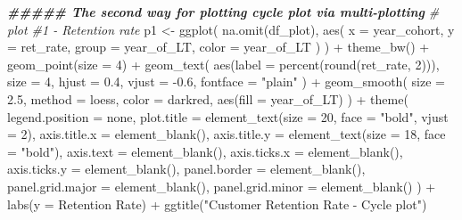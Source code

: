 \documentclass[
]{book}
\newenvironment{Shaded}{\begin{snugshade}}{\end{snugshade}}
\newcommand{\AttributeTok}[1]{\textcolor[rgb]{0.77,0.63,0.00}{#1}}
\newcommand{\CommentTok}[1]{\textcolor[rgb]{0.56,0.35,0.01}{\textit{#1}}}
\newcommand{\DecValTok}[1]{\textcolor[rgb]{0.00,0.00,0.81}{#1}}
\newcommand{\DocumentationTok}[1]{\textcolor[rgb]{0.56,0.35,0.01}{\textbf{\textit{#1}}}}
\newcommand{\FloatTok}[1]{\textcolor[rgb]{0.00,0.00,0.81}{#1}}
\newcommand{\FunctionTok}[1]{\textcolor[rgb]{0.00,0.00,0.00}{#1}}
\newcommand{\NormalTok}[1]{#1}
\newcommand{\OtherTok}[1]{\textcolor[rgb]{0.56,0.35,0.01}{#1}}
\newcommand{\SpecialCharTok}[1]{\textcolor[rgb]{0.00,0.00,0.00}{#1}}
\newcommand{\StringTok}[1]{\textcolor[rgb]{0.31,0.60,0.02}{#1}}
\begin{document}
\begin{Shaded}
\begin{Highlighting}[]
\DocumentationTok{\#\#\#\#\# The second way for plotting cycle plot via multi{-}plotting}
\CommentTok{\# plot \#1 {-} Retention rate}
\NormalTok{p1 }\OtherTok{\textless{}{-}}
    \FunctionTok{ggplot}\NormalTok{(}
        \FunctionTok{na.omit}\NormalTok{(df\_plot),}
        \FunctionTok{aes}\NormalTok{(}
            \AttributeTok{x =}\NormalTok{ year\_cohort,}
            \AttributeTok{y =}\NormalTok{ ret\_rate,}
            \AttributeTok{group =}\NormalTok{ year\_of\_LT,}
            \AttributeTok{color =}\NormalTok{ year\_of\_LT}
\NormalTok{        )}
\NormalTok{    ) }\SpecialCharTok{+}
    \FunctionTok{theme\_bw}\NormalTok{() }\SpecialCharTok{+}
    \FunctionTok{geom\_point}\NormalTok{(}\AttributeTok{size =} \DecValTok{4}\NormalTok{) }\SpecialCharTok{+}
    \FunctionTok{geom\_text}\NormalTok{(}
        \FunctionTok{aes}\NormalTok{(}\AttributeTok{label =} \FunctionTok{percent}\NormalTok{(}\FunctionTok{round}\NormalTok{(ret\_rate, }\DecValTok{2}\NormalTok{))),}
        \AttributeTok{size =} \DecValTok{4}\NormalTok{,}
        \AttributeTok{hjust =} \FloatTok{0.4}\NormalTok{,}
        \AttributeTok{vjust =} \SpecialCharTok{{-}}\FloatTok{0.6}\NormalTok{,}
        \AttributeTok{fontface =} \StringTok{"plain"}
\NormalTok{    ) }\SpecialCharTok{+}
    \FunctionTok{geom\_smooth}\NormalTok{(}
        \AttributeTok{size =} \FloatTok{2.5}\NormalTok{,}
        \AttributeTok{method =} \StringTok{\textquotesingle{}loess\textquotesingle{}}\NormalTok{,}
        \AttributeTok{color =} \StringTok{\textquotesingle{}darkred\textquotesingle{}}\NormalTok{,}
        \FunctionTok{aes}\NormalTok{(}\AttributeTok{fill =}\NormalTok{ year\_of\_LT)}
\NormalTok{    ) }\SpecialCharTok{+}
    \FunctionTok{theme}\NormalTok{(}
        \AttributeTok{legend.position =} \StringTok{\textquotesingle{}none\textquotesingle{}}\NormalTok{,}
        \AttributeTok{plot.title =} \FunctionTok{element\_text}\NormalTok{(}\AttributeTok{size =} \DecValTok{20}\NormalTok{, }\AttributeTok{face =} \StringTok{"bold"}\NormalTok{, }\AttributeTok{vjust =} \DecValTok{2}\NormalTok{),}
        \AttributeTok{axis.title.x =} \FunctionTok{element\_blank}\NormalTok{(),}
        \AttributeTok{axis.title.y =} \FunctionTok{element\_text}\NormalTok{(}\AttributeTok{size =} \DecValTok{18}\NormalTok{, }\AttributeTok{face =} \StringTok{"bold"}\NormalTok{),}
        \AttributeTok{axis.text =} \FunctionTok{element\_blank}\NormalTok{(),}
        \AttributeTok{axis.ticks.x =} \FunctionTok{element\_blank}\NormalTok{(),}
        \AttributeTok{axis.ticks.y =} \FunctionTok{element\_blank}\NormalTok{(),}
        \AttributeTok{panel.border =} \FunctionTok{element\_blank}\NormalTok{(),}
        \AttributeTok{panel.grid.major =} \FunctionTok{element\_blank}\NormalTok{(),}
        \AttributeTok{panel.grid.minor =} \FunctionTok{element\_blank}\NormalTok{()}
\NormalTok{    ) }\SpecialCharTok{+}
    \FunctionTok{labs}\NormalTok{(}\AttributeTok{y =} \StringTok{\textquotesingle{}Retention Rate\textquotesingle{}}\NormalTok{) }\SpecialCharTok{+}
    \FunctionTok{ggtitle}\NormalTok{(}\StringTok{"Customer Retention Rate {-} Cycle plot"}\NormalTok{)}


\end{Highlighting}
\end{Shaded}
\end{document}
